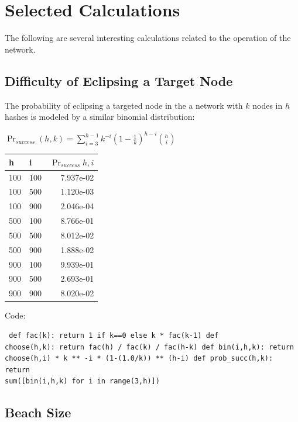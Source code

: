 \documentclass[a4paper,10pt]{article} \usepackage[utf8]{inputenc}
\begin{document}
\section{Selected Calculations}

The following are several interesting calculations related to the operation of
the network.

\subsection{Difficulty of Eclipsing a Target Node}

The probability of eclipsing a targeted node in the a network with $ k $ nodes
in $ h $ hashes is modeled by a similar binomial distribution:

{\centering $\Pr_{success}(h, k) = \displaystyle \sum_{i=3}^{h-1}
k^{-i}(1-\frac{1}{k})^{h-i}{h \choose i}$ \\}

\begin{table}[hbt!] \begin{center} \begin{tabular}{l l r} h & i &
$\Pr_{success}{h,i}$\\ \hline  100 & 100 & 7.937e-02\\ \hline  100 & 500 &
1.120e-03\\ \hline  100 & 900 & 2.046e-04\\ \hline  500 & 100 & 8.766e-01\\
\hline  500 & 500 & 8.012e-02\\ \hline  500 & 900 & 1.888e-02\\ \hline  900 &
100 & 9.939e-01\\ \hline  900 & 500 & 2.693e-01\\ \hline  900 & 900 &
8.020e-02\\ \end{tabular} \end{center} \end{table}

Code: \begin{lstlisting} def fac(k): return 1 if k==0 else k * fac(k-1) def
choose(h,k): return fac(h) / fac(k) / fac(h-k) def bin(i,h,k): return
choose(h,i) * k ** -i * (1-(1.0/k)) ** (h-i) def prob_succ(h,k): return
sum([bin(i,h,k) for i in range(3,h)]) \end{lstlisting}

\subsection{Beach Size}
\end{document}
